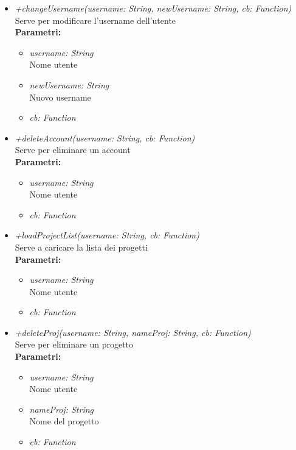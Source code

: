 \begin{itemize}
\begin{itemize}
\begin{itemize}
    		\end{itemize}
    		\item \emph{+changeUsername(username: String, newUsername: String, cb: Function)}\\
    		Serve per modificare l'username dell'utente\\
    		\textbf{Parametri:}
    		\begin{itemize}
    			\item \emph{username: String}\\
    			Nome utente
    			\item \emph{newUsername: String}\\
    			Nuovo username
    			\item \emph{cb: Function}\\
    			
    		\end{itemize}
    		\item \emph{+deleteAccount(username: String, cb: Function)}\\
    		Serve per eliminare un account\\
    		\textbf{Parametri:}
    		\begin{itemize}
    			\item \emph{username: String}\\
    			Nome utente
    			\item \emph{cb: Function}\\
    			
    		\end{itemize}
    		\item \emph{+loadProjectList(username: String, cb: Function)}\\
    		Serve a caricare la lista dei progetti\\
    		\textbf{Parametri:}
    		\begin{itemize}
    			\item \emph{username: String}\\
    			Nome utente
    			\item \emph{cb: Function}\\
    			
    		\end{itemize}
    		\item \emph{+deleteProj(username: String, nameProj: String, cb: Function)}\\
    		Serve per eliminare un progetto\\
    		\textbf{Parametri:}
    		\begin{itemize}
    			\item \emph{username: String}\\
    			Nome utente
    			\item \emph{nameProj: String}\\
    			Nome del progetto
    			\item \emph{cb: Function}\\
    			

\end{itemize}
\end{itemize}
\end{itemize}
